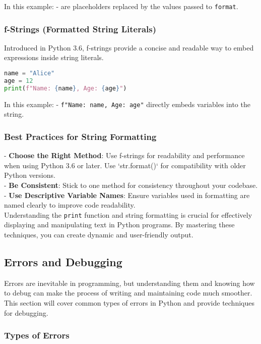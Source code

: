 In this example:
- \texttt{{}{}} are placeholders replaced by the values passed to \texttt{format}.

\subsubsection{f-Strings (Formatted String Literals)}

Introduced in Python 3.6, f-strings provide a concise and readable way to embed expressions inside string literals.

\begin{lstlisting}[language=Python, caption=f-Strings Example]
name = "Alice"
age = 12
print(f"Name: {name}, Age: {age}")
\end{lstlisting}

In this example:
- \texttt{f"Name: {name}, Age: {age}"} directly embeds variables into the string.

\subsubsection{Best Practices for String Formatting}

- \textbf{Choose the Right Method}: Use f-strings for readability and performance when using Python 3.6 or later. Use `str.format()` for compatibility with older Python versions.
\\
- \textbf{Be Consistent}: Stick to one method for consistency throughout your codebase.
\\
- \textbf{Use Descriptive Variable Names}: Ensure variables used in formatting are named clearly to improve code readability.
\\
Understanding the \texttt{print} function and string formatting is crucial for effectively displaying and manipulating text in Python programs. By mastering these techniques, you can create dynamic and user-friendly output.

\subsection{Errors and Debugging}

Errors are inevitable in programming, but understanding them and knowing how to debug can make the process of writing and maintaining code much smoother. This section will cover common types of errors in Python and provide techniques for debugging.

\subsubsection{Types of Errors}

